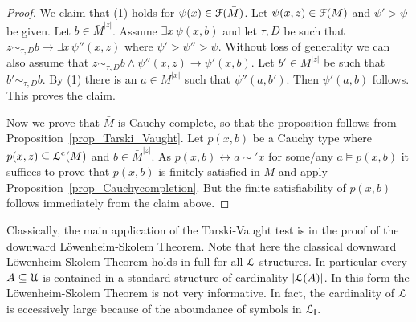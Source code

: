 \documentclass[10pt,oneside]{amsproc}
\newcommand{\mylabel}[1]{{#1}\hfill}
\renewenvironment{itemize}
  {\begin{list}{$\triangleright$}{%
  \setlength{\parskip}{0mm}
  \setlength{\topsep}{.4\baselineskip}
  \setlength{\rightmargin}{0mm}
  \setlength{\listparindent}{0mm}
  \setlength{\itemindent}{0mm}
  \setlength{\labelwidth}{3ex}
  \setlength{\itemsep}{.2\baselineskip}
  \setlength{\parsep}{.2\baselineskip}
  \setlength{\partopsep}{0mm}
  \setlength{\labelsep}{1ex}
  \setlength{\leftmargin}{\labelwidth+\labelsep}
  \let\makelabel\mylabel}}{%
\end{list}}
\begin{document}
{\begin{proof}
  We claim that (1) holds for $\psi(x)\in{\EuScript F}(\bar M)$.
  Let $\psi(x,z)\in{\EuScript F}(M)$ and $\psi'>\psi$ be given.
  Let $b\in\bar M^{|z|}$.
  Assume $\exists x\,\psi(x,b)$ and let $\tau,D$ be such that $z\sim_{\tau,D}b\rightarrow\exists x\,\psi''(x,z)$ where $\psi'>\psi''>\psi$.
  Without loss of generality we can also assume that $z\sim_{\tau,D}b\wedge\psi''(x,z)\rightarrow\psi'(x,b)$.
  Let $b'\in M^{|z|}$ be such that $b'\sim_{\tau,D}b$.
  By (1) there is an $a\in M^{|x|}$ such that $\psi''(a,b')$.
  Then $\psi'(a,b)$ follows.
  This proves the claim.

  Now we prove that $\bar M$ is Cauchy complete, so that the proposition follows from Proposition~\ref{prop_Tarski_Vaught}.
  Let $p(x,b)$ be a Cauchy type where $p(x,z)\subseteq{\EuScript L}^{\rm c}(M)$ and $b\in\bar M^{|z|}$.
  As $p(x,b)\leftrightarrow a\sim'x$ for some/any $a\models p(x,b)$ it suffices to prove that $p(x,b)$ is finitely satisfied in $M$ and apply Proposition~\ref{prop_Cauchycompletion}.
  But the finite satisfiability of  $p(x,b)$ follows immediately from the claim above.
\end{proof}




    
   

Classically, the main application of the Tarski-Vaught test is in the proof of the downward L\"owen\-heim-Skolem Theorem.
Note that here the classical downward L\"owenheim-Skolem Theorem holds in full for all ${\EuScript L}$-structures.
In particular every $A\subseteq{\EuScript U}$ is contained in a standard structure of cardinality $|{\EuScript L}(A)|$.
In this form the L\"owenheim-Skolem Theorem is not very informative.
In fact, the cardinality of ${\EuScript L}$ is eccessively large because of the aboundance of symbols in ${\EuScript L}_{\sf I}$.

}
\end{document}
